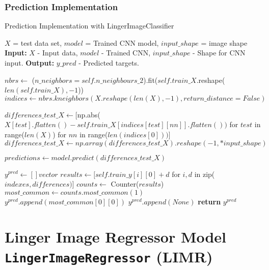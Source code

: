 \documentclass[a4paper, 12pt]{report}
\begin{document}
\subsubsection{Prediction Implementation}

\begin{algorithm}
    \caption{Prediction Implementation with LingerImageClassifier}
    \label{alg:prediction_implementation_with_lingerImageClassifier}
    \begin{algorithmic}[1]
    \State $X$ = test data set, $model$ = Trained CNN model, $input\_shape$ = image shape
        \State \textbf{Input:} $X$ - Input data, $model$ - Trained CNN, $input\_shape$ - Shape for CNN input.
        \State \textbf{Output:} $y\_pred$ - Predicted targets.
        
        \State $nbrs \gets$ ($n\_neighbors=self.n\_neighbours\_2$).fit($self.train\_X$.reshape($len(self.train\_X), -1$))
        \State $indices \gets nbrs.kneighbors(X.reshape(len(X), -1), return\_distance=False)$
        
        \State $differences\_test\_X \gets [$np.abs($X[test].flatten() - self.train\_X[indices[test][nn]].flatten())$ for $test$ in range($len(X)$) for $nn$ in range($len(indices[0]))]$
        \State $differences\_test\_X \gets np.array(differences\_test\_X).reshape(-1, *input\_shape)$
        
        \State $predictions \gets model.predict(differences\_test\_X)$
        
        \State $y^{pred} \gets [] vector$
            \State $results \gets [self.train\_y[i][0] + d$ for $i, d$ in zip($indexes, differences)$]
            \State $counts \gets$ Counter($results$)
            \State $most\_common \gets counts.most\_common(1)$
                \State $y^{pred}.append(most\_common[0][0])$
            \Else
                \State $y^{pred}.append(None)$
            \EndIf
        \EndFor
        \State \textbf{return} $y^{pred}$
    \EndProcedure
    \end{algorithmic}
\end{algorithm}

\section{Linger Image Regressor Model \texttt{LingerImageRegressor} (LIMR)}
\label{sec:lingerImage_Regressor_model}
\end{document}
